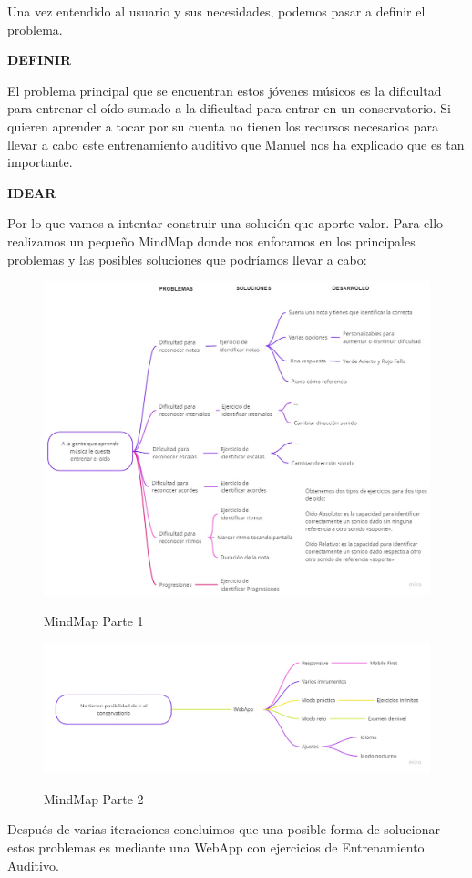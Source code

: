 \documentclass[12pt,twoside,titlepage]{report}
\begin{document}
Una vez entendido al usuario y sus necesidades, podemos pasar a definir el problema.

\textbf{DEFINIR}

El problema principal que se encuentran estos jóvenes músicos es la dificultad para entrenar el oído sumado a la dificultad para entrar en un conservatorio. Si quieren aprender a tocar por su cuenta no tienen los recursos necesarios para llevar a cabo este entrenamiento auditivo que Manuel nos ha explicado que es tan importante.

\textbf{IDEAR}

Por lo que vamos a intentar construir una solución que aporte valor. Para ello realizamos un pequeño MindMap donde nos enfocamos en los principales problemas y las posibles soluciones que podríamos llevar a cabo:

\begin{figure}[H]
    \centering
    \includegraphics[scale=0.37]{MINDMAP11}
    \label{fig:Mindmap1}
    \caption{MindMap Parte 1}
\end{figure}

\begin{figure}[H]
    \centering
    \includegraphics[scale=0.22]{MINDMAP2}
    \label{fig:Mindmap2}
    \caption{MindMap Parte 2}
\end{figure}
Después de varias iteraciones concluimos que una posible forma de solucionar estos problemas es mediante una WebApp con ejercicios de Entrenamiento Auditivo. 
\end{document}
